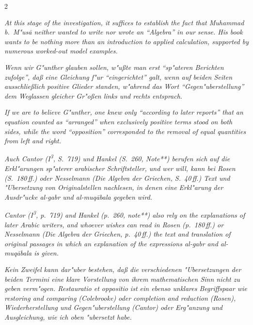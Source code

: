 \documentclass[10pt,a4paper]{article}
\newcommand{\enquote}[1]{``#1''}
\begin{document}
\begin{paracol}{2}
\switchcolumn

\textit{At this stage of the investigation, it suffices to establish the fact that Muhammad b.\ M"us\=a neither wanted to write nor wrote an \enquote{Algebra} in our sense. His book wants to be nothing more than an introduction to applied calculation, supported by numerous worked-out model examples.}

\switchcolumn*

\textit{Wenn wir G"unther glauben sollen, w"u\ss{}te man erst \enquote{sp"ateren Berichten zufolge}, da\ss{} eine Gleichung f"ur \enquote{eingerichtet} galt, wenn auf beiden Seiten ausschlie\ss{}lich positive Glieder standen, w"ahrend das Wort \enquote{Gegen"uberstellung} dem Weglassen gleicher Gr"o\ss{}en links und rechts entsprach.}

\switchcolumn

\textit{If we are to believe G"unther, one knew only \enquote{according to later reports} that an equation counted as \enquote{arranged} when exclusively positive terms stood on both sides, while the word \enquote{opposition} corresponded to the removal of equal quantities from left and right.}

\switchcolumn*

\textit{Auch Cantor (I\textsuperscript{3}, S.\ 719) und Hankel (S.\ 260, Note**) berufen sich auf die Erkl"arungen sp"aterer arabischer Schriftsteller, und wer will, kann bei Rosen (S.\ 180\,ff.) oder Nesselmann (\textit{Die Algebra der Griechen}, S.\ 40\,ff.) Text und "Ubersetzung von Originalstellen nachlesen, in denen eine Erkl"arung der Ausdr"ucke \textit{al-gabr} und \textit{al-muq\=abala} gegeben wird.}

\switchcolumn

\textit{Cantor (I\textsuperscript{3}, p.\ 719) and Hankel (p.\ 260, note**) also rely on the explanations of later Arabic writers, and whoever wishes can read in Rosen (p.\ 180\,ff.) or Nesselmann (\textit{Die Algebra der Griechen}, p.\ 40\,ff.) the text and translation of original passages in which an explanation of the expressions \textit{al-gabr} and \textit{al-muq\=abala} is given.}

\switchcolumn*

\textit{Kein Zweifel kann dar"uber bestehen, da\ss{} die verschiedenen "Ubersetzungen der beiden Termini eine klare Vorstellung von ihrem mathematischen Sinn nicht zu geben verm"ogen. \textit{Restauratio et oppositio} ist ein ebenso unklares Begriffspaar wie \textit{restoring and comparing} (Colebrooke) oder \textit{completion and reduction} (Rosen), \textit{Wiederherstellung und Gegen"uberstellung} (Cantor) oder \textit{Erg"anzung und Ausgleichung}, wie ich oben "ubersetzt habe.}


\end{paracol}
\end{document}
